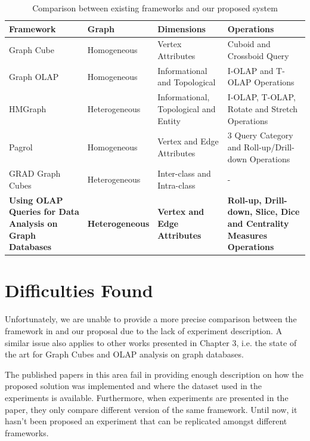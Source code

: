 \begin{table}[!ht]
\setlength\extrarowheight{2pt}
\caption{Comparison between existing frameworks and our proposed system}
\label{tb:table2}
\begin{tabularx}{\textwidth}{|Y|Z|Z|Z|}
\hline
{}\textbf{Framework} & \textbf{Graph} & \textbf{Dimensions} & \textbf{Operations}\\\hline
{ Graph Cube} & Homogeneous & Vertex Attributes & Cuboid and Crossboid Query\\\hline
{ Graph OLAP} & Homogeneous & Informational and Topological & I-OLAP and T-OLAP Operations\\\hline
{ HMGraph} & Heterogeneous & Informational, Topological and Entity & I-OLAP, T-OLAP, Rotate and Stretch Operations\\\hline
{ Pagrol} & Homogeneous & Vertex and Edge Attributes & 3 Query Category and Roll-up/Drill-down Operations \\ \hline
{ GRAD Graph Cubes} & Heterogeneous & Inter-class and Intra-class & - \\ \hline
{ \textbf{Using OLAP Queries for Data Analysis on Graph Databases}} & \textbf{Heterogeneous} & \textbf{Vertex and Edge Attributes} & \textbf{Roll-up, Drill-down, Slice, Dice and Centrality Measures Operations} \\ \hline
\end{tabularx}
\end{table}

\section{Difficulties Found}

Unfortunately, we are unable to provide a more precise comparison between the framework in \cite{Ghrab2013} and our proposal due to the lack of experiment description. A similar issue also applies to other works presented in Chapter 3, i.e. the state of the art for Graph Cubes and OLAP analysis on graph databases.

The published papers in this area fail in providing enough description on how the proposed solution was implemented and where the dataset used in the experiments is available. Furthermore, when experiments are presented in the paper, they only compare different version of the same framework. Until now, it hasn't been proposed an experiment that can be replicated amongst different frameworks.

